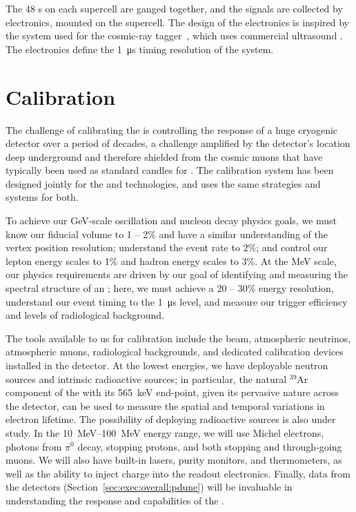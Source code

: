 The 48 s on each  supercell are ganged together, and the signals are collected by  electronics, mounted on the supercell. The design of the   electronics is inspired by the system used for the  cosmic-ray tagger~\cite{bib:mu2e_tdr}, which uses commercial ultrasound . The  electronics define the \SI{1}{\micro\second} timing resolution of the  system.

\section{Calibration}
\label{sec:exec-sp-calibration}

The challenge of calibrating the   is controlling the response of a huge cryogenic detector over a period of decades, a challenge amplified by the detector's location deep underground and therefore shielded from the cosmic muons that have typically been used as standard candles for %
.  The  calibration system  has been designed jointly for the  and  technologies, and uses the same strategies and systems for both.

To achieve our \si{\giga\electronvolt}-scale oscillation and nucleon decay physics goals, we must know our fiducial volume to 1 -- 2\% and have a similar understanding of the vertex position resolution; understand the \nue event rate to 2\%; and control our lepton energy scales to 1\% and hadron energy scales to 3\%. At the \si{\mega\electronvolt} scale, our physics requirements are driven by our goal of identifying and measuring the spectral structure of an ; here, we must achieve a 20 -- 30\% energy resolution, understand our event timing to the \SI{1}{\micro\second} level, and measure our trigger efficiency and levels of radiological background. 

The tools available to us for calibration include the  beam, atmospheric neutrinos, atmospheric muons, radiological backgrounds, and dedicated calibration devices installed in the detector. At the lowest energies, we have deployable neutron sources and intrinsic radioactive sources; in particular, the natural $^{39}$Ar component of the  with its \SI{565}{\kilo\electronvolt} end-point, given its pervasive nature across the detector, can be used to measure the spatial and temporal variations in electron lifetime. The possibility of deploying radioactive sources is also under study. %
In the \SIrange{10}{100}{\mega\electronvolt} energy range, we will use Michel electrons, photons from $\pi^{0}$ decay, stopping protons, and both stopping and through-going muons. We will also have built-in lasers, purity monitors, and thermometers, as well as the ability to inject charge into the readout electronics. Finally, data from the  detectors  (Section~\ref{sec:exec:overall:pdune}) will be invaluable in understanding the response and  capabilities of the .

